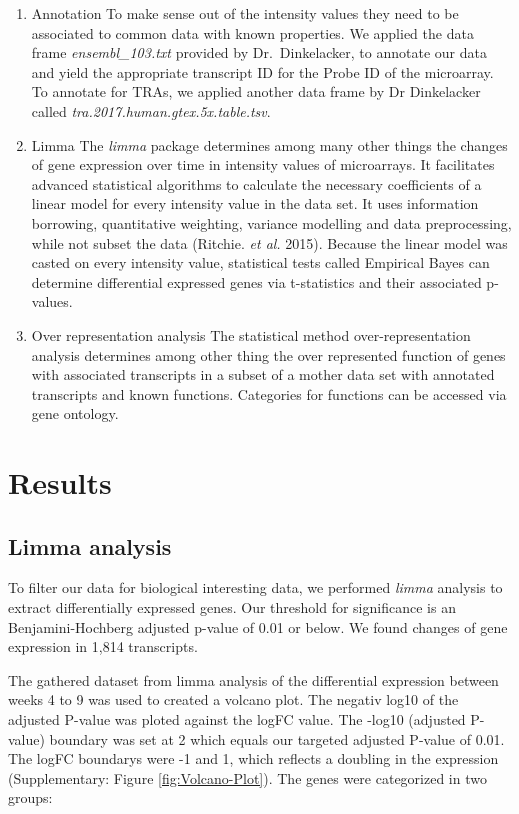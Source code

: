 \documentclass[
]{article}
\begin{document}
\begin{enumerate}
\def\labelenumi{\arabic{enumi}.}
\item
  Annotation
  To make sense out of the intensity values they need to be associated to common data with known properties. We applied the data frame \emph{ensembl\_103.txt} provided by Dr.~Dinkelacker, to annotate our data and yield the appropriate transcript ID for the Probe ID of the microarray. To annotate for TRAs, we applied another data frame by Dr Dinkelacker called \emph{tra.2017.human.gtex.5x.table.tsv}.
\item
  Limma
  The \emph{limma} package determines among many other things the changes of gene expression over time in intensity values of microarrays. It facilitates advanced statistical algorithms to calculate the necessary coefficients of a linear model for every intensity value in the data set. It uses information borrowing, quantitative weighting, variance modelling and data preprocessing, while not subset the data (Ritchie. \emph{et al.} 2015). Because the linear model was casted on every intensity value, statistical tests called Empirical Bayes can determine differential expressed genes via t-statistics and their associated p-values.
\item
  Over representation analysis
  The statistical method over-representation analysis determines among other thing the over represented function of genes with associated transcripts in a subset of a mother data set with annotated transcripts and known functions. Categories for functions can be accessed via gene ontology.
\end{enumerate}

\hypertarget{results}{%
\section{Results}\label{results}}

\hypertarget{limma}{%
\subsection{Limma analysis}\label{limma}}

To filter our data for biological interesting data, we performed \emph{limma} analysis to extract differentially expressed genes. Our threshold for significance is an Benjamini-Hochberg adjusted p-value of 0.01 or below. We found changes of gene expression in 1,814 transcripts.

The gathered dataset from limma analysis of the differential expression between weeks 4 to 9 was used to created a volcano plot. The negativ log10 of the adjusted P-value was ploted against the logFC value. The -log10 (adjusted P-value) boundary was set at 2 which equals our targeted adjusted P-value of 0.01. The logFC boundarys were -1 and 1, which reflects a doubling in the expression (Supplementary: Figure \ref{fig:Volcano-Plot}). The genes were categorized in two groups:
\end{document}
